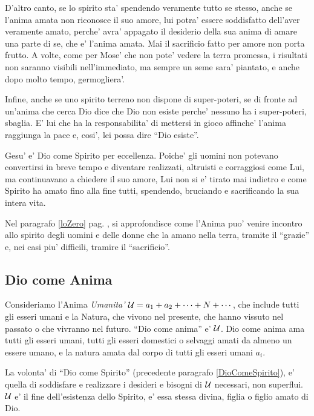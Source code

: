     D'altro canto, se lo spirito sta' spendendo veramente tutto se stesso, anche se l'anima amata non riconosce il suo amore, lui potra' essere soddisfatto dell'aver veramente amato, perche' avra' appagato il desiderio della sua anima di amare una parte di se, che e' l'anima amata. Mai il sacrificio fatto per amore non porta frutto. A volte, come per Mose' che non pote' vedere la terra promessa, i risultati non saranno visibili nell'immediato, ma sempre un seme sara' piantato, e anche dopo molto tempo, germogliera'.

    Infine, anche se uno spirito terreno non dispone di super-poteri, se di fronte ad un'anima che cerca Dio dice che Dio non esiste perche' nessuno ha i super-poteri, sbaglia. E' lui che ha la responsabilita' di mettersi in gioco affinche' l'anima raggiunga la pace e, cosi', lei possa dire ``Dio esiste''.

Gesu' e' Dio come Spirito per eccellenza. Poiche' gli uomini non potevano convertirsi in breve tempo e diventare realizzati, altruisti e corraggiosi come Lui, ma continuavano a chiedere il suo amore, Lui non si e' tirato mai indietro e come Spirito ha amato fino alla fine tutti, spendendo, bruciando e sacrificando la sua intera vita.

 Nel paragrafo \ref{loZero} pag. \pageref{loZero}, si approfondisce come l'Anima puo' venire incontro allo spirito degli uomini e delle donne che la amano nella terra, tramite il ``grazie'' e, nei casi piu' difficili, tramire il ``sacrificio''. 


\subsection{Dio come Anima}
\label{PureSoulAsGod}
\label{SecondaDefinizioneDio}

Consideriamo l'Anima \emph{Umanita'} $\mathcal{U}=a_1+a_2+\cdots+N+\cdots$, che include tutti gli esseri umani e la Natura, che vivono nel presente, che hanno vissuto nel passato o che vivranno nel futuro. ``Dio come anima'' e' $\mathcal{U}$. Dio come anima ama tutti gli esseri umani, tutti gli esseri domestici o selvaggi amati da almeno un essere umano, e la natura amata dal corpo di tutti gli esseri umani $a_i$.

La volonta' di ``Dio come Spirito'' (precedente paragrafo \ref{DioComeSpirito}), e' quella di soddisfare e realizzare i desideri e bisogni di $\mathcal{U}$ necessari, non superflui. $\mathcal{U}$ e' il fine dell'esistenza dello Spirito, e' essa stessa divina, figlia o figlio amato di Dio. 

